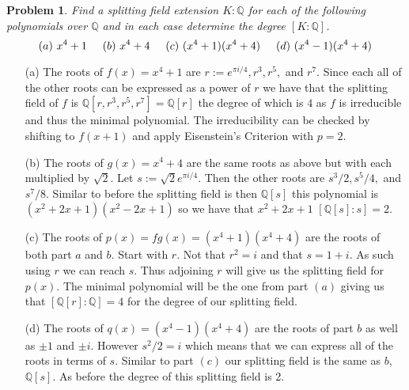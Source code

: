 \documentclass[10pt]{article}
\newcommand{\sk}{\vskip 10mm}
\newcommand{\bb}[1]{\mathbb{#1}}
\theoremstyle{plain}
\newtheorem{problem}{Problem}
\theoremstyle{remark}
\begin{document}
\sk

\begin{problem}
  Find a splitting field extension $K: \mathbb{Q}$ for each
  of the following polynomials over $\mathbb{Q}$ and in each
  case determine the degree $[K:\mathbb{Q}]$.
\begin{equation*}
    (a) \text{  } x^4 + 1 \hspace{5mm} (b) \text{  } x^4 + 4 \hspace{5mm}
    (c) \text{  } (x^4 +1)(x^4+4) \hspace{5mm} (d) \text{  } (x^4-1)(x^4+4)
\end{equation*}
\end{problem}

\begin{itemize}
\item[(a)] The roots of $f(x)=x^4+1$ are $r:=e^{\pi i/4},r^3,r^5,$ and $r^7$. Since
  each all of the other roots can be expressed as a power of $r$ we have that
  the splitting field of $f$ is $\bb{Q}[r,r^3,r^5,r^7]=\bb{Q}[r]$ the degree of which
  is $4$ as $f$ is irreducible and thus the minimal polynomial. The irreducibility can
  be checked by shifting to $f(x+1)$ and apply Eisenstein's Criterion with $p=2$.
\item[(b)] The roots of $g(x)=x^4+4$ are the same roots as above but with each multiplied
  by $\sqrt{2}$. Let $s:=\sqrt{2}e^{\pi i /4}$. Then the other roots are $s^3/2,s^5/4,$ and
  $s^7/8$. Similar to before the splitting field is then $\bb{Q}[s]$ this polynomial is
  $(x^2+2x+1)(x^2-2x+1)$ so we have that $x^2+2x+1$ $[\bb{Q}[s]:s]=2$.

\item[(c)] The roots of $p(x)=fg(x)=(x^4+1)(x^4+4)$ are the roots of both part $a$ and $b$.
  Start with $r$. Not that $r^2=i$ and that $s=1+i$. As such using $r$ we can reach $s$.
  Thus adjoining $r$ will give us the splitting field for $p(x)$.
  The minimal polynomial will be the one from part $(a)$ giving
  us that $[\bb{Q}[r]:\bb{Q}]=4$ for the degree of our splitting field.
\item[(d)] The roots of $q(x)=(x^4-1)(x^4+4)$ are the roots of part $b$ as well
  as $\pm 1$ and $\pm i$. However $s^2/2=i$ which means that we can express all of the roots
  in terms of $s$. Similar to part $(c)$ our splitting field is the same as $b$, $\bb{Q}[s]$.
  As before the degree of this splitting field is 2.
\end{itemize}

\sk
\end{document}
